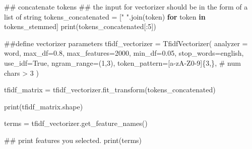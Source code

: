 \documentclass[
  letterpaper,
]{scrbook}
\newenvironment{Shaded}{\begin{snugshade}}{\end{snugshade}}
\newcommand{\BuiltInTok}[1]{\textcolor[rgb]{0.00,0.23,0.31}{#1}}
\newcommand{\CommentTok}[1]{\textcolor[rgb]{0.37,0.37,0.37}{#1}}
\newcommand{\ControlFlowTok}[1]{\textcolor[rgb]{0.00,0.23,0.31}{\textbf{#1}}}
\newcommand{\DecValTok}[1]{\textcolor[rgb]{0.68,0.00,0.00}{#1}}
\newcommand{\FloatTok}[1]{\textcolor[rgb]{0.68,0.00,0.00}{#1}}
\newcommand{\KeywordTok}[1]{\textcolor[rgb]{0.00,0.23,0.31}{\textbf{#1}}}
\newcommand{\NormalTok}[1]{\textcolor[rgb]{0.00,0.23,0.31}{#1}}
\newcommand{\OperatorTok}[1]{\textcolor[rgb]{0.37,0.37,0.37}{#1}}
\newcommand{\StringTok}[1]{\textcolor[rgb]{0.13,0.47,0.30}{#1}}
\newcommand{\VariableTok}[1]{\textcolor[rgb]{0.07,0.07,0.07}{#1}}
\begin{document}
\begin{Shaded}
\begin{Highlighting}[]
\CommentTok{\#\# concatenate tokens}
\CommentTok{\#\# the input for vectorizer should be in the form of a list of string}
\NormalTok{tokens\_concatenated }\OperatorTok{=}\NormalTok{ [}\StringTok{" "}\NormalTok{.join(token) }\ControlFlowTok{for}\NormalTok{ token }\KeywordTok{in}\NormalTok{ tokens\_stemmed]}
\BuiltInTok{print}\NormalTok{(tokens\_concatenated[:}\DecValTok{5}\NormalTok{])}
\end{Highlighting}
\end{Shaded}

\begin{Shaded}
\begin{Highlighting}[]
\CommentTok{\#\#define vectorizer parameters}
\NormalTok{tfidf\_vectorizer }\OperatorTok{=}\NormalTok{ TfidfVectorizer(}
\NormalTok{                                    analyzer }\OperatorTok{=} \StringTok{\textquotesingle{}word\textquotesingle{}}\NormalTok{,}
\NormalTok{                                    max\_df}\OperatorTok{=}\FloatTok{0.8}\NormalTok{, }
\NormalTok{                                    max\_features}\OperatorTok{=}\DecValTok{2000}\NormalTok{,}
\NormalTok{                                    min\_df}\OperatorTok{=}\FloatTok{0.05}\NormalTok{, }
\NormalTok{                                    stop\_words}\OperatorTok{=}\StringTok{\textquotesingle{}english\textquotesingle{}}\NormalTok{,}
\NormalTok{                                    use\_idf}\OperatorTok{=}\VariableTok{True}\NormalTok{, }
\NormalTok{                                    ngram\_range}\OperatorTok{=}\NormalTok{(}\DecValTok{1}\NormalTok{,}\DecValTok{3}\NormalTok{),}
\NormalTok{                                    token\_pattern}\OperatorTok{=}\StringTok{\textquotesingle{}[a{-}zA{-}Z0{-}9]\{3,\}\textquotesingle{}}\NormalTok{,  }\CommentTok{\# num chars \textgreater{} 3}
\NormalTok{                                  )}

\NormalTok{tfidf\_matrix }\OperatorTok{=}\NormalTok{ tfidf\_vectorizer.fit\_transform(tokens\_concatenated)}

\BuiltInTok{print}\NormalTok{(tfidf\_matrix.shape)}

\NormalTok{terms }\OperatorTok{=}\NormalTok{ tfidf\_vectorizer.get\_feature\_names()}

\CommentTok{\#\# print features you selected.}
\BuiltInTok{print}\NormalTok{(terms)}
\end{Highlighting}
\end{Shaded}
\end{document}

